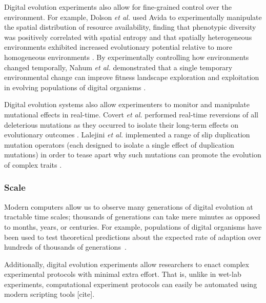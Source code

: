 Digital evolution experiments also allow for fine-grained control over the environment.
For example, Dolson \textit{et al.} used Avida to experimentally manipulate the spatial distribution of resource availability, finding that phenotypic diversity was positively correlated with spatial entropy and that spatially heterogeneous environments exhibited increased evolutionary potential relative to more homogeneous environments \citep{dolson_spatial_2017}.
By experimentally controlling how environments changed temporally, Nahum \textit{et al.} demonstrated that a single temporary environmental change can improve fitness landscape exploration and exploitation in evolving populations of digital organisms \citep{nahum_improved_2017}.

Digital evolution systems also allow experimenters to monitor and manipulate mutational effects in real-time.
Covert \textit{et al.} performed real-time reversions of all deleterious mutations as they occurred to isolate their long-term effects on evolutionary outcomes \citep{covert_experiments_2013}.
Lalejini \textit{et al.} implemented a range of slip duplication mutation operators (each designed to isolate a single effect of duplication mutations) in order to tease apart why such mutations can promote the evolution of complex traits \citep{lalejini_gene_2017}.


\subsubsection{Scale}

Modern computers allow us to observe many generations of digital evolution at tractable time scales; thousands of generations can take mere minutes as opposed to months, years, or centuries.
For example, populations of digital organisms have been used to test theoretical predictions about the expected rate of adaption over hundreds of thousands of generations~\citep{wiser_analysis_2015,wiser_boundedness_2018}.

Additionally, digital evolution experiments allow researchers to enact complex experimental protocols with minimal extra effort. 
That is, unlike in wet-lab experiments, computational experiment protocols can easily be automated using modern scripting tools [cite].

